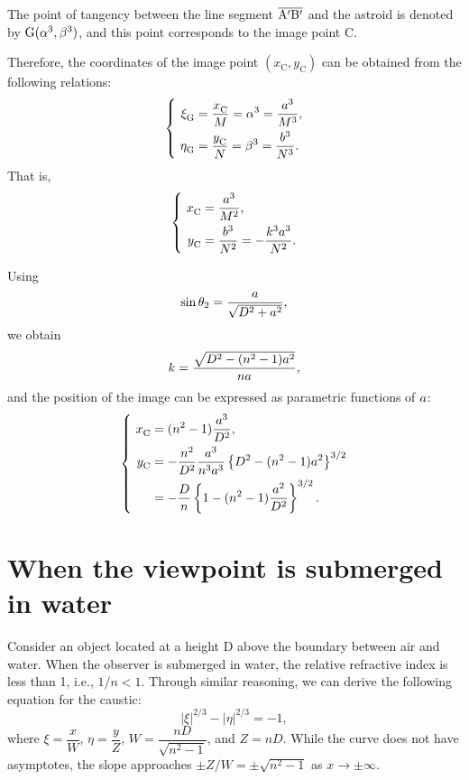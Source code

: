 \documentclass[twocolumn]{article}
\begin{document}
The point of tangency between the line segment $\overline{\mathrm{{A^{\prime}}{B^{\prime}}}}$ and the astroid is denoted by $\mathrm{G}({\alpha}^3, {\beta}^3)$, and this point corresponds to the image point C. 

Therefore, the coordinates of the image point $(x_{\mathrm{C}}^{}, y_{\mathrm{C}}^{})$ can be obtained from the following relations:
$$ \left\{ 
\begin{aligned}
	\xi_{\mathrm{G}}^{} &= \dfrac{x_{\mathrm{C}}^{}}{M} = \greeka^3 = \dfrac{\romana^3}{M^3},\\
	\eta_{\mathrm{G}}^{} &= \dfrac{y_{\mathrm{C}}^{}}{N} = \greekb^3 = \dfrac{\romanb^3}{N^3}.
\end{aligned}
\right.$$
That is,
$$ \left\{ 
\begin{aligned}
	x_{\mathrm{C}}^{} &= \dfrac{\romana^3}{M^2},\\
	y_{\mathrm{C}}^{} &= \dfrac{\romanb^3}{N^2}=-\dfrac{k^3\romana^3}{N^2}.
\end{aligned}
\right.$$

Using 
$$\sin\theta_2 = \dfrac{{a}}{\sqrt{D^2+{a}^2}},$$
we obtain
$$k = \dfrac{\sqrt{D^2-(n^2-1){a}^2}}{n{a}},$$
and the position of the image can be expressed as parametric functions of ${a}$:
$$ \left\{ 
\begin{aligned}
	x_{\mathrm{C}}^{} &= (n^2-1)\dfrac{\romana^3}{D^2},\\
	y_{\mathrm{C}}^{} &= -\dfrac{n^2}{D^2}\dfrac{\romana^3}
	{n^3\romana^3}\left\{ D^2-(n^2-1)\romana^2 \right\}^{3/2}\\
	&=-\dfrac{D}{n}\left\{ 1-(n^2-1)\dfrac{\romana^2}{D^2} \right\}^{3/2}.
\end{aligned}
\right.$$

\section{When the viewpoint is submerged in water}

Consider an object located at a height D above the boundary between air and water. When the observer is submerged in water, the relative refractive index is less than 1, i.e., $1/n < 1$. Through similar reasoning, we can derive the following equation for the caustic:
$$ \left| \xi \right|^{2/3} - \left| \eta \right|^{2/3} = -1, $$
where $\xi = \dfrac{x}{W} $, $\eta = \dfrac{y}{Z}$, $W = \dfrac{nD}{\sqrt{n^2-1}}$, and $Z = nD$. 
While the curve does not have asymptotes, the slope approaches $\pm Z/W = \pm \sqrt{n^2-1}$ as $x \to \pm\infty$.
\end{document}
